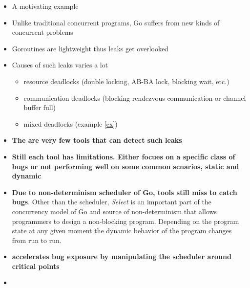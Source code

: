 \begin{itemize}
  \item A motivating example
  \item Unlike traditional concurrent programs, Go suffers from new kinds of concurrent problems
  \item Goroutines are lightweight thus leaks get overlooked
  \item Causes of such leaks varies a lot
  \begin{itemize}
    \item resource deadlocks (double locking, AB-BA lock, blocking wait, etc.)
    \item communication deadlocks (blocking rendezvous communication or channel buffer full)
    \item mixed deadlocks (example \ref{ex})
  \end{itemize}
  \item \textbf{The are very few tools that can detect such leaks}
  \item \textbf{Still each tool has limitations. Either focues on a specific class of bugs or not performing well on some common scnarios, static and dynamic}
  \item \textbf{Due to non-determinism scheduler of Go, tools still miss to catch bugs}. Other than the scheduler, \textit{Select} is an important part of the concurrency model of Go and source of non-determinism that allows programmers to design a non-blocking program. Depending on the program state at any given moment the dynamic behavior of the program changes from run to run.
  \item \textbf{\goat accelerates bug exposure by manipulating the scheduler around critical points}
  \item {}
\end{itemize}
